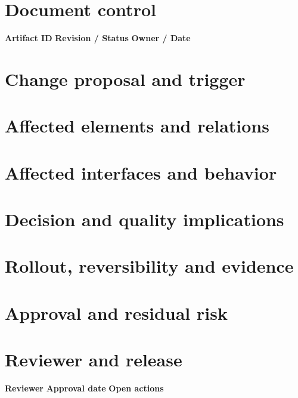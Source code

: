 \documentclass[10pt,letterpaper]{article}
\begin{document}
\DocProvenance
\section{Document control}
\textbf{Artifact ID}
\textbf{Revision / Status}
\textbf{Owner / Date}
\section{Change proposal and trigger}
\section{Affected elements and relations}
\section{Affected interfaces and behavior}
\section{Decision and quality implications}
\section{Rollout, reversibility and evidence}
\section{Approval and residual risk}
\section{Reviewer and release}
\textbf{Reviewer}
\textbf{Approval date}
\textbf{Open actions}
\end{document}
